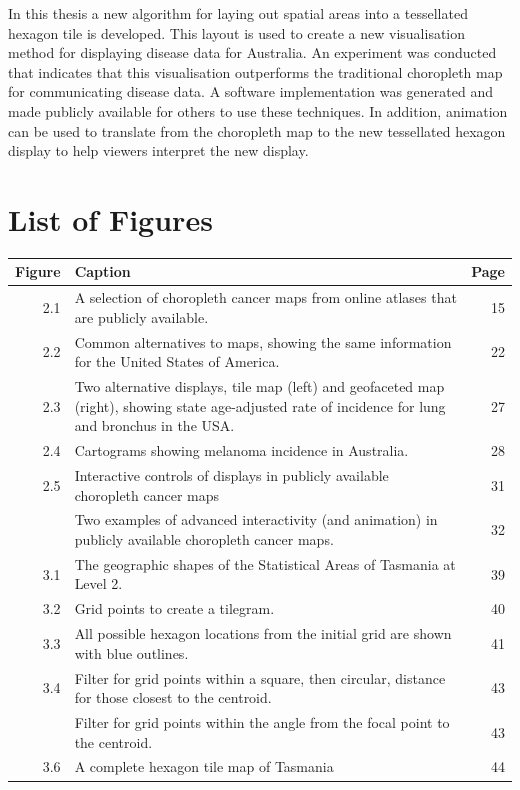 \documentclass{monashthesis}
\begin{document}
In this thesis a new algorithm for laying out spatial areas into a tessellated hexagon tile is developed. This layout is used to create a new visualisation method for displaying disease data for Australia.
An experiment was conducted that indicates that this visualisation outperforms the traditional choropleth map for communicating disease data.
A software implementation was generated and made publicly available for others to use these techniques. In addition, animation can be used to translate from the choropleth map to the new tessellated hexagon display to help viewers interpret the new display.

\newpage

\hypertarget{list-of-figures}{%
\chapter*{List of Figures}\label{list-of-figures}}

\begin{tabular}{r>{\raggedright\arraybackslash}p{30em}r}
\toprule
Figure & Caption & Page\\
\midrule
2.1 & A selection of choropleth cancer maps from online atlases that are publicly available. & 15\\
2.2 & Common alternatives to maps, showing the same information for the United States of America. & 22\\
2.3 & Two alternative displays, tile map (left) and geofaceted map (right), showing state age-adjusted rate of incidence for lung and bronchus in the USA. & 27\\
2.4 & Cartograms showing melanoma incidence in Australia. & 28\\
2.5 & Interactive controls of displays in publicly available choropleth cancer maps & 31\\
\addlinespace
2.6 & Two examples of advanced interactivity (and animation) in publicly available choropleth cancer maps. & 32\\
3.1 & The geographic shapes of the Statistical Areas of Tasmania at Level 2. & 39\\
3.2 & Grid points to create a tilegram. & 40\\
3.3 & All possible hexagon locations from the initial grid are shown with blue outlines. & 41\\
3.4 & Filter for grid points within a square, then circular, distance for those closest to the centroid. & 43\\
\addlinespace
3.5 & Filter for grid points within the angle from the focal point to the centroid. & 43\\
3.6 & A complete hexagon tile map of Tasmania & 44\\
\bottomrule
\end{tabular}
\end{document}
